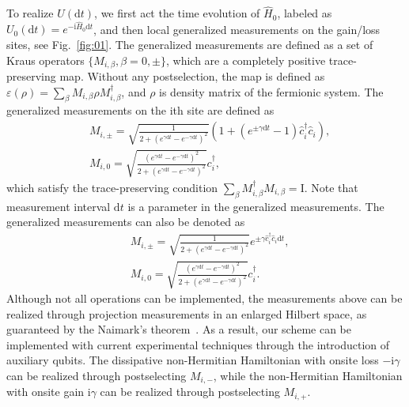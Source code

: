 \documentclass[longbibliography, aps, prx, amsmath, amssymb, amsfonts, twocolumn,superscriptaddress, footinbib]{revtex4-1}
\begin{document}
	To realize $U(\mathrm{d} t)$, we first act the time evolution of $\hat{H}_{0}$, labeled  as $U_0(\mathrm{d}t)=e^{-\mathrm{i}\hat{H}_0 \mathrm{d} t}$, and then local generalized measurements on the gain/loss sites, see Fig.~\ref{fig:01}.
	The generalized measurements are defined as a set of Kraus operators $\{M_{i,\beta},\beta=0,\pm \}$, which are a completely positive trace-preserving map. Without any postselection, the map is defined as
	$\varepsilon(\rho) = \sum_{\beta} M_{i, \beta} \rho M_{i, \beta}^{\dagger}$, and $\rho$ is density matrix of the fermionic system.
	The generalized measurements on the ith site are defined as
	\begin{align}
		&M_{i,\pm} = \sqrt{\frac{1}{2+(e^{\gamma \mathrm{d} t} - e^{-\gamma \mathrm{d} t})^2}} (1 + (e^{\pm \gamma \mathrm{d} t}-1) \hat{c}_i^{\dagger} \hat{c}_i),\\
		&M_{i,0} = \sqrt{\frac{(e^{\gamma \mathrm{d} t} - e^{-\gamma \mathrm{d} t})^2}{2+(e^{\gamma \mathrm{d} t} - e^{-\gamma \mathrm{d} t})^2}} c_i^{\dagger},
	\end{align}
	which satisfy the trace-preserving condition $\sum_{\beta} M_{i,\beta}^{\dagger} M_{i,\beta}=\mathrm{I}$. 
	Note that measurement interval $\mathrm{d}t$ is a parameter in the generalized measurements. 
	The generalized measurements can also be denoted as 
	\begin{align}
		&M_{i,\pm} = \sqrt{\frac{1}{2+(e^{\gamma \mathrm{d} t} - e^{-\gamma \mathrm{d} t})^2}} e^{\pm\gamma \hat{c}_i^{\dagger} \hat{c}_i\mathrm{d} t},\\
		&M_{i,0} = \sqrt{\frac{(e^{\gamma \mathrm{d} t} - e^{-\gamma \mathrm{d} t})^2}{2+(e^{\gamma \mathrm{d} t} - e^{-\gamma \mathrm{d} t})^2}} c_i^{\dagger}.
	\end{align}	
	Although not all operations can be implemented, the measurements above can be realized through projection measurements in an enlarged Hilbert space, as guaranteed by the Naimark's theorem~\cite{coecke2008povms,nielsen2001quantum}. As a result, our scheme can be implemented with current experimental techniques through the introduction of auxiliary qubits.
	The dissipative non-Hermitian Hamiltonian with onsite loss $-\mathrm{i}\gamma$ can be realized through postselecting $M_{i,-}$, while the non-Hermitian Hamiltonian with onsite gain $\mathrm{i}\gamma$ can be realized through postselecting $M_{i,+}$.
	
\end{document}
